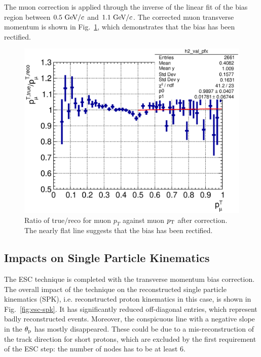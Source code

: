      The muon correction is applied through the inverse of the linear fit of the bias region between $0.5~\textrm{GeV}/c$ and $1.1~\textrm{GeV}/c$.
     The corrected muon transverse momentum is shown in Fig.~\ref{fig:esc-cormupt}, which demonstrates that the bias has been rectified.

     \begin{figure}[h]
     \centering
     \includegraphics[width=\sgfidwid\textwidth]{figures/sel/mu_pt_vs_cor_mu_pt_bias_hist2d_al14.eps} 
     \caption{Ratio of true$/$reco for muon $p_T$ against muon $p_\textrm{T}$ after correction. The nearly flat line suggests that the bias has been rectified.}
     \label{fig:esc-cormupt}
     \end{figure}

    \subsection{Impacts on Single Particle Kinematics}
     The ESC technique is completed with the transverse momentum bias correction.
     The overall impact of the technique on the reconstructed single particle kinematics (SPK), i.e. reconstructed proton kinematics in this case, is shown in Fig.~\ref{fig:esc-spk}.
     It has significantly reduced off-diagonal entries, which represent badly reconstructed events.
     Moreover, the conspicuous line with a negative slope in the $\theta_\textrm{p}$ has mostly disappeared.
     These could be due to a mis-reconstruction of the track direction for short protons, which are excluded by the first requirement of the ESC step: the number of nodes has to be at least $6$.
     
